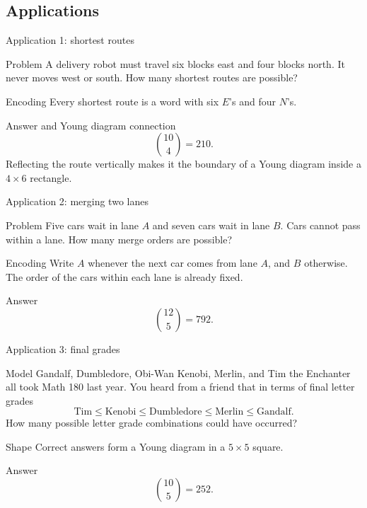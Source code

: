\documentclass{beamer}
\begin{document}
\subsection{Applications}

\begin{frame}{Application 1: shortest routes}
\footnotesize
  \begin{block}{Problem}
    A delivery robot must travel six blocks east and four blocks north.
    It never moves west or south.  How many shortest routes are possible?
  \end{block}
\pause
  \begin{block}{Encoding}
    Every shortest route is a word with six $E$'s and four $N$'s.
  \end{block}
\pause
  \begin{block}{Answer and Young diagram connection}
    \[
       \binom{10}{4}=210.
    \]
    Reflecting the route vertically makes it the boundary of a Young diagram
    inside a $4\times6$ rectangle.
  \end{block}
\end{frame}

\begin{frame}{Application 2: merging two lanes}
\small
  \begin{block}{Problem}
    Five cars wait in lane $A$ and seven cars wait in lane $B$.
    Cars cannot pass within a lane.  How many merge orders are possible?
  \end{block}
\pause
  \begin{block}{Encoding}
    Write $A$ whenever the next car comes from lane $A$, and $B$ otherwise.
    The order of the cars within each lane is already fixed.
  \end{block}
\pause
  \begin{block}{Answer}
    \[
       \binom{12}{5}=792.
    \]
  \end{block}
\end{frame}

\begin{frame}{Application 3: final grades}
\scriptsize
  \begin{block}{Model}
    Gandalf, Dumbledore, Obi-Wan Kenobi, Merlin, and Tim the Enchanter all took Math 180 last year.  You heard from a friend that
    in terms of final letter grades
    $$\text{Tim}\leq \text{Kenobi} \leq \text{Dumbledore} \leq \text{Merlin} \leq \text{Gandalf}.$$
    How many possible letter grade combinations could have occurred?
  \end{block}
\pause
  \begin{block}{Shape}
    Correct answers form a Young diagram in a $5\times 5$ square.
  \end{block}
\pause
  \begin{block}{Answer}
    \[
       \binom{10}{5}=252.
    \]
  \end{block}
\end{frame}
\end{document}

